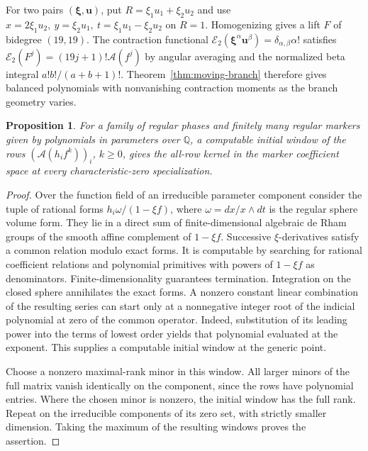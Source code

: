 \documentclass[11pt]{article}
\newtheorem{proposition}[theorem]{Proposition}
\newcommand{\A}{\mathcal A}
\newcommand{\Q}{\mathbb Q}
\begin{document}
For two pairs \((\boldsymbol\xi,\boldsymbol u)\), put
\(R=\xi_1u_1+\xi_2u_2\) and use
\(x=2\xi_1u_2,\ y=\xi_2u_1,\ t=\xi_1u_1-\xi_2u_2\) on \(R=1\).
Homogenizing gives a lift \(F\) of bidegree \((19,19)\).
The contraction functional
\(\mathcal E_2(\boldsymbol\xi^\alpha\boldsymbol u^\beta)
=\delta_{\alpha,\beta}\alpha!\) satisfies
\(\mathcal E_2(F^j)=(19j+1)!\A(f^j)\) by angular averaging and
the normalized beta integral \(a!b!/(a+b+1)!\).
Theorem~\ref{thm:moving-branch} therefore gives balanced
polynomials with nonvanishing contraction moments as the
branch geometry varies.

\begin{proposition}\label{prop:effective-window}
For a family of regular phases and finitely many regular markers
given by polynomials in parameters over \(\Q\), a computable
initial window of the rows \((\A(h_i f^k))_i\), \(k\ge0\), gives
the all-row kernel in the marker coefficient space at every
characteristic-zero specialization.
\end{proposition}
\begin{proof}
Over the function field of an irreducible parameter component
consider the tuple of rational forms \(h_i\omega/(1-\xi f)\),
where \(\omega=dx/x\wedge dt\) is the regular sphere volume form.
They lie in a direct sum of finite-dimensional algebraic de
Rham groups of the smooth affine complement of \(1-\xi f\).
Successive \(\xi\)-derivatives satisfy a common relation
modulo exact forms. It is computable by searching for rational
coefficient relations and polynomial primitives with powers
of \(1-\xi f\) as denominators. Finite-dimensionality guarantees
termination. Integration on the closed sphere annihilates
the exact forms. A nonzero constant linear combination of the
resulting series can start only at a nonnegative integer root
of the indicial polynomial at zero of the common operator.
Indeed, substitution of its leading power into the terms of
lowest order yields that polynomial evaluated at the exponent.
This supplies a computable initial window at the generic point.

Choose a nonzero maximal-rank minor in this window. All larger
minors of the full matrix vanish identically on the component,
since the rows have polynomial entries. Where the chosen
minor is nonzero, the initial window has the full rank.
Repeat on the irreducible components of its zero set, with
strictly smaller dimension. Taking the maximum of the
resulting windows proves the assertion.
\end{proof}
\end{document}
